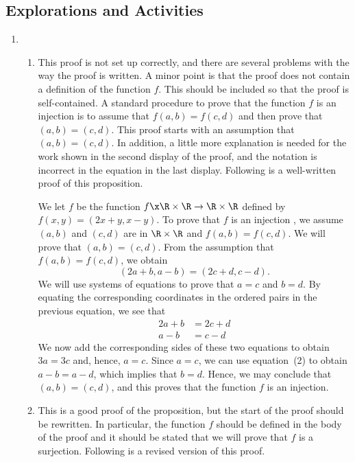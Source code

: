\subsection*{Explorations and Activities}
\setcounter{oldenumi}{\theenumi}
\begin{enumerate} \setcounter{enumi}{\theoldenumi}
\setcounter{equation}{0}
\item \begin{enumerate}
\item This proof is not set up correctly, and there are several problems with the way the proof is written.   A minor point is that the proof does not contain a definition of the function $f$.  This should be included so that the proof is self-contained.  A standard procedure to prove that the function $f$ is an injection is to assume that $f(a, b) = f(c, d)$ and then prove that $(a, b) = (c, d)$.  This proof starts with an assumption that $(a, b) = (c, d)$.  In addition, a little more explanation is needed for the work shown in the second display of the proof, and the notation is incorrect in the equation in the last display.  Following is a well-written proof of this proposition.


\quarter
\begin{myproof}
We let $f$ be the function $f\x\R \times \R \to \R \times \R$ defined by  
$f( {x, y} ) = ( {2x + y, x - y} )$.  To prove that $f$ is an injection , we assume 
$(a, b)$ and $(c, d)$ are in $\R \times \R$ and $f(a, b) = f(c, d)$.  We will prove that 
$(a, b) = (c, d)$.  From the assumption that $f(a, b) = f(c, d)$, we obtain
\[
(2a + b, a - b) = (2c + d, c - d).
\]
We will use systems of equations to prove that $a = c$ and $b = d$.  By equating the corresponding coordinates in the ordered pairs in the previous equation, we see that
\begin{align}
2a + b &= 2c + d \\
 a - b &=  c - d
\end{align}
We now add the corresponding sides of these two equations to obtain $3a = 3c$ and, hence, $a = c$.
  Since $a = c$, we can use equation~(2) to obtain $a - b = a - d$, which implies that $b = d$. Hence, we may conclude that $(a, b) = (c, d)$, and this proves that the function $f$ is an injection.
\end{myproof}

\item This is a good proof of the proposition, but the start of the proof should be rewritten.  In particular, the function $f$ should be defined in the body of the proof and it should be stated that we will prove that $f$ is a surjection.  Following is a revised version of this proof.


\end{enumerate}
\end{enumerate}
